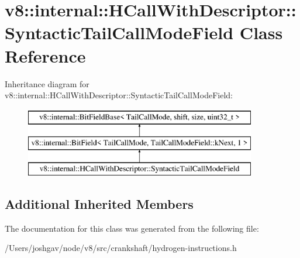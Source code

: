\hypertarget{classv8_1_1internal_1_1_h_call_with_descriptor_1_1_syntactic_tail_call_mode_field}{}\section{v8\+:\+:internal\+:\+:H\+Call\+With\+Descriptor\+:\+:Syntactic\+Tail\+Call\+Mode\+Field Class Reference}
\label{classv8_1_1internal_1_1_h_call_with_descriptor_1_1_syntactic_tail_call_mode_field}
Inheritance diagram for v8\+:\+:internal\+:\+:H\+Call\+With\+Descriptor\+:\+:Syntactic\+Tail\+Call\+Mode\+Field\+:\begin{figure}[H]
\begin{center}
\leavevmode
\includegraphics[height=3.000000cm]{classv8_1_1internal_1_1_h_call_with_descriptor_1_1_syntactic_tail_call_mode_field}
\end{center}
\end{figure}
\subsection*{Additional Inherited Members}


The documentation for this class was generated from the following file\+:\begin{DoxyCompactItemize}
\item 
/\+Users/joshgav/node/v8/src/crankshaft/hydrogen-\/instructions.\+h\end{DoxyCompactItemize}
